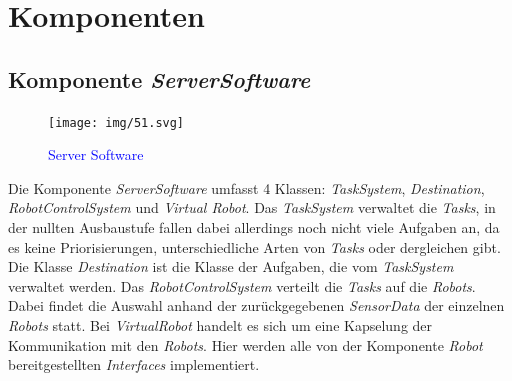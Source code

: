 \section{Komponenten}

\subsection{Komponente \textit{ServerSoftware}}
\begin{figure}[H]
\centering
\texttt{[image: img/51.svg]}
\caption{\textcolor{blue}{Server Software}}
\label{KomponentenStruktur1}
\end{figure}
Die Komponente \textit{ServerSoftware} umfasst 4 Klassen: \textit{TaskSystem}, \textit{Destination}, \textit{RobotControlSystem} und \textit{Virtual Robot}.
Das \textit{TaskSystem} verwaltet die \textit{Tasks}, in der nullten Ausbaustufe fallen dabei allerdings noch nicht viele Aufgaben an, 
da es keine Priorisierungen, unterschiedliche Arten von \textit{Tasks} oder dergleichen gibt. Die Klasse \textit{Destination} ist die Klasse 
der Aufgaben, die vom \textit{TaskSystem} verwaltet werden. Das \textit{RobotControlSystem} verteilt die \textit{Tasks} auf die \textit{Robots}. 
Dabei findet die Auswahl anhand der zurückgegebenen \textit{SensorData} der einzelnen \textit{Robots} statt. Bei \textit{VirtualRobot} handelt 
es sich um eine Kapselung der Kommunikation mit den \textit{Robots}. Hier werden alle von der Komponente \textit{Robot} bereitgestellten 
\textit{Interfaces} implementiert.
